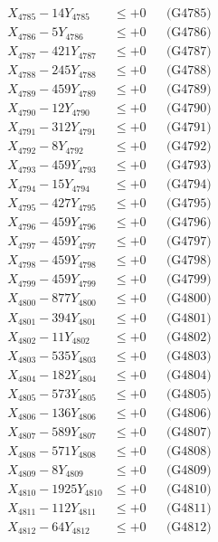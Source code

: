 \documentclass[a4paper,10pt]{article}
\begin{document}
{\begin{align}
X_{4785} - 14Y_{4785} &\leq +0 && \text{(G4785)} \\
X_{4786} - 5Y_{4786} &\leq +0 && \text{(G4786)} \\
X_{4787} - 421Y_{4787} &\leq +0 && \text{(G4787)} \\
X_{4788} - 245Y_{4788} &\leq +0 && \text{(G4788)} \\
X_{4789} - 459Y_{4789} &\leq +0 && \text{(G4789)} \\
X_{4790} - 12Y_{4790} &\leq +0 && \text{(G4790)} \\
\allowbreak
X_{4791} - 312Y_{4791} &\leq +0 && \text{(G4791)} \\
X_{4792} - 8Y_{4792} &\leq +0 && \text{(G4792)} \\
X_{4793} - 459Y_{4793} &\leq +0 && \text{(G4793)} \\
X_{4794} - 15Y_{4794} &\leq +0 && \text{(G4794)} \\
X_{4795} - 427Y_{4795} &\leq +0 && \text{(G4795)} \\
X_{4796} - 459Y_{4796} &\leq +0 && \text{(G4796)} \\
X_{4797} - 459Y_{4797} &\leq +0 && \text{(G4797)} \\
X_{4798} - 459Y_{4798} &\leq +0 && \text{(G4798)} \\
X_{4799} - 459Y_{4799} &\leq +0 && \text{(G4799)} \\
X_{4800} - 877Y_{4800} &\leq +0 && \text{(G4800)} \\
\allowbreak
X_{4801} - 394Y_{4801} &\leq +0 && \text{(G4801)} \\
X_{4802} - 11Y_{4802} &\leq +0 && \text{(G4802)} \\
X_{4803} - 535Y_{4803} &\leq +0 && \text{(G4803)} \\
X_{4804} - 182Y_{4804} &\leq +0 && \text{(G4804)} \\
X_{4805} - 573Y_{4805} &\leq +0 && \text{(G4805)} \\
X_{4806} - 136Y_{4806} &\leq +0 && \text{(G4806)} \\
X_{4807} - 589Y_{4807} &\leq +0 && \text{(G4807)} \\
X_{4808} - 571Y_{4808} &\leq +0 && \text{(G4808)} \\
X_{4809} - 8Y_{4809} &\leq +0 && \text{(G4809)} \\
X_{4810} - 1925Y_{4810} &\leq +0 && \text{(G4810)} \\
\allowbreak
X_{4811} - 112Y_{4811} &\leq +0 && \text{(G4811)} \\
X_{4812} - 64Y_{4812} &\leq +0 && \text{(G4812)} \\

\end{align}}
\end{document}
